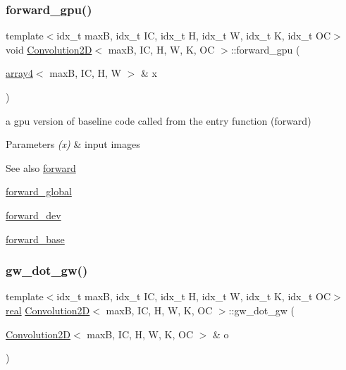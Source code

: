 \subsubsection{\texorpdfstring{forward\+\_\+gpu()}{forward\_gpu()}}
{\footnotesize\ttfamily template$<$idx\+\_\+t maxB, idx\+\_\+t IC, idx\+\_\+t H, idx\+\_\+t W, idx\+\_\+t K, idx\+\_\+t OC$>$ \\
void \hyperlink{structConvolution2D}{Convolution2D}$<$ maxB, IC, H, W, K, OC $>$\+::forward\+\_\+gpu (\begin{DoxyParamCaption}\item[{\hyperlink{structarray4}{array4}$<$ maxB, IC, H, W $>$ \&}]{x }\end{DoxyParamCaption})\hspace{0.3cm}{\ttfamily [inline]}}



a gpu version of baseline code called from the entry function (forward) 


\begin{DoxyParams}{Parameters}
{\em (x)} & input images \\
\hline
\end{DoxyParams}
\begin{DoxySeeAlso}{See also}
\hyperlink{structConvolution2D_ae6dcfaea38b779de24bbda730c57083e}{forward} 

\hyperlink{softmaxcrossentropy_8h_a578aeeb166bd06e800d9b396eab48b35}{forward\+\_\+global} 

\hyperlink{structConvolution2D_a1e5d3b49b05f8444178be5f73f59bedd}{forward\+\_\+dev} 

\hyperlink{structConvolution2D_aa969d35c6c2ca209354d3fd9249fcf82}{forward\+\_\+base} 
\end{DoxySeeAlso}
\mbox{\label{structConvolution2D_a41442b7f48f34045660dbcd64301d14b}} 
\subsubsection{\texorpdfstring{gw\+\_\+dot\+\_\+gw()}{gw\_dot\_gw()}}
{\footnotesize\ttfamily template$<$idx\+\_\+t maxB, idx\+\_\+t IC, idx\+\_\+t H, idx\+\_\+t W, idx\+\_\+t K, idx\+\_\+t OC$>$ \\
\hyperlink{vgg__util_8h_a1082d08aaa761215ec83e7149f27ad16}{real} \hyperlink{structConvolution2D}{Convolution2D}$<$ maxB, IC, H, W, K, OC $>$\+::gw\+\_\+dot\+\_\+gw (\begin{DoxyParamCaption}\item[{\hyperlink{structConvolution2D}{Convolution2D}$<$ maxB, IC, H, W, K, OC $>$ \&}]{o }\end{DoxyParamCaption})\hspace{0.3cm}{\ttfamily [inline]}}



